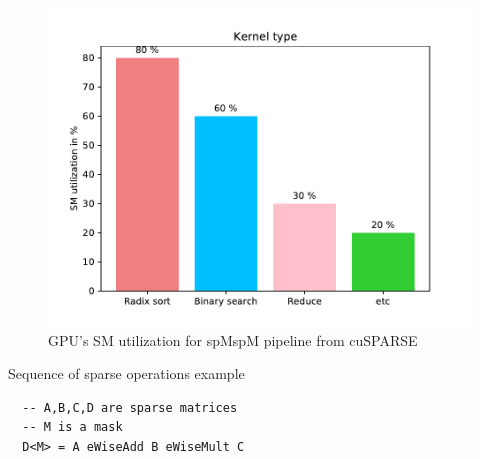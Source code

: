 \documentclass[10pt,conference]{IEEEtran}
\begin{document}
\begin{figure}[t]
  \centering
  \includegraphics[width=\linewidth]{figs/SM_performance.pdf}
  \caption[Caption for LOF]{GPU's SM utilization for spMspM pipeline from cuSPARSE\footnotemark}
  \label{fig:sm_util}
\end{figure}


\begin{listing}
  \caption{Sequence of sparse operations example}
\label{listing:1}

\begin{verbatim}
  -- A,B,C,D are sparse matrices
  -- M is a mask
  D<M> = A eWiseAdd B eWiseMult C
\end{verbatim}

\end{listing}
\end{document}

